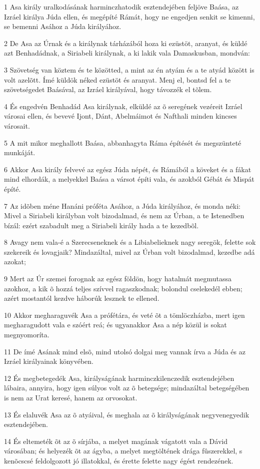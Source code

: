 \par 1 Asa király uralkodásának harminczhatodik esztendejében feljöve Baása, az Izráel királya Júda ellen, és  megépíté Rámát, hogy ne engedjen senkit se kimenni, se bemenni Asához a Júda királyához.
\par 2 De Asa az Úrnak és a királynak tárházából hoza ki ezüstöt, aranyat, és küldé azt Benhadádnak, a Siriabeli királynak, a ki lakik vala Damaskusban, mondván:
\par 3 Szövetség van köztem és te közötted, a mint az én atyám és a te atyád között is volt azelõtt. Ímé küldök néked ezüstöt és aranyat. Menj el, bontsd fel a te szövetségedet Baásával, az Izráel királyával, hogy távozzék el tõlem.
\par 4 És engedvén Benhadád Asa királynak, elküldé az õ seregének vezéreit Izráel városai ellen, és bevevé Ijont, Dánt, Abelmáimot és Nafthali minden kincses városait.
\par 5 A mit mikor meghallott Baása, abbanhagyta Ráma építését és megszünteté munkáját.
\par 6 Akkor Asa király felvevé az egész Júda népét, és Rámából a köveket és a fákat mind elhordák, a melyekkel Baása a vársot építi vala, és azokból Gébát és Mispát építé.
\par 7 Az idõben méne Hanáni próféta Asához, a Júda királyához, és monda néki: Mivel a Siriabeli királyban volt bizodalmad, és nem az Úrban, a te Istenedben bízál: ezért szabadult meg a Siriabeli király hada a te kezedbõl.
\par 8 Avagy nem vala-é a Szerecseneknek és a Libiabelieknek nagy seregök, felette sok szekereik és lovagjaik? Mindazáltal, mivel az Úrban volt bizodalmad, kezedbe adá azokat;
\par 9 Mert az Úr szemei forognak az egész földön, hogy hatalmát megmutassa azokhoz, a kik õ hozzá teljes szívvel ragaszkodnak; bolondul  cselekedél ebben; azért mostantól kezdve háborúk lesznek te ellened.
\par 10 Akkor megharaguvék Asa a prófétára, és veté õt a tömlöczházba, mert igen megharagudott vala e szóért reá; és ugyanakkor Asa a nép közül is sokat megnyomoríta.
\par 11 De ímé Asának mind elsõ, mind utolsó dolgai meg vannak írva a Júda és az Izráel királyainak könyvében.
\par 12 És megbetegedék Asa, királyságának harminczkilenczedik esztendejében lábaira, annyira, hogy igen súlyos volt az õ betegsége; mindazáltal betegségében is nem az Urat keresé, hanem az orvosokat.
\par 13 És elaluvék Asa az õ atyáival, és meghala az õ királyságának negyvenegyedik esztendejében.
\par 14 És eltemeték õt az õ sírjába, a melyet magának vágatott vala a Dávid városában; és helyezék õt az ágyba, a melyet megtöltének drága fûszerekkel, s kenõcscsé feldolgozott jó illatokkal, és érette felette nagy égést rendezének.


